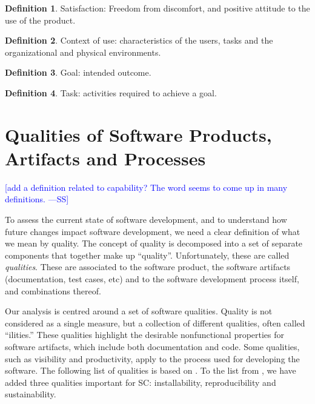 \documentclass[letterpaper, cleveref]{lipics-v2019}
\newcommand{\authornote}[3]{\textcolor{#1}{[#3 ---#2]}}
\newcommand{\authornote}[3]{}
\newcommand{\wss}[1]{\authornote{blue}{SS}{#1}} %
\theoremstyle{definition}
\newtheorem{defn}{Definition}
\begin{document}
\begin{defn}
\textsf{Satisfaction}: 
Freedom from discomfort, and positive attitude to the use of the product.
\cite{ISO9241:11}
\end{defn}

\begin{defn}
\textsf{Context of use}:
characteristics of the users, tasks and the organizational and physical
environments. \cite{ISO9241:11}
\end{defn}

\begin{defn}
\textsf{Goal}: intended outcome. \cite{ISO9241:11}
\end{defn}

\begin{defn}
\textsf{Task}: activities required to achieve a goal. \cite{ISO9241:11}
\end{defn}

\section{Qualities of Software Products, Artifacts and Processes}
\label{SecQualities}

\wss{add a definition related to capability?  The word seems to come up in  many definitions.}

To assess the current state of software development, and to understand how
future changes impact software development, we need a clear definition of what
we mean by quality.  The concept of quality is decomposed into a set of separate
components that together make up ``quality''. Unfortunately, these are called
\emph{qualities}. These are associated to the software product, the software
artifacts (documentation, test cases, etc) and to the software development
process itself, and combinations thereof.

Our analysis is centred around a set of software qualities.  Quality is not
considered as a single measure, but a collection of different qualities, often
called ``ilities.''  These qualities highlight the desirable nonfunctional
properties for software artifacts, which include both documentation and
code. Some qualities, such as visibility and productivity, apply to the process
used for developing the software. The following list of qualities is based on
\cite{GhezziEtAl2003}. To the list from \cite{GhezziEtAl2003}, we have added
three qualities important for SC: installability, reproducibility and
sustainability.

\end{document}
